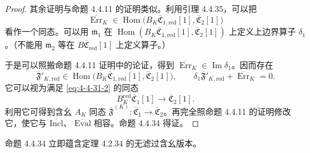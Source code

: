 \begin{proof}
其余证明与命题 4.4.11 的证明类似。利用引理 4.4.35，可以把
\[
 \overline{\operatorname{Err}}_K
 \in\operatorname{Hom}\bigl(
 B_K\overline{\mathfrak C}_{1,\mathrm{red}}[1],
 \overline{\mathfrak C}_2[1]
 \bigr)
\]
看作一个同态。可以用 $\overline{\mathfrak m}_1$ 在
$\operatorname{Hom}(B_K\overline{\mathfrak C}_{1,\mathrm{red}}[1],
\overline{\mathfrak C}_2[1])$ 上定义上边界算子 $\delta_1$。（不能用
$\overline{\mathfrak m}_2$ 等在
$B\overline{\mathfrak C}_{\mathrm{red}}[1]$ 上定义算子。）

于是可以照搬命题 4.4.11 证明中的论证，得到
$\overline{\operatorname{Err}}_K\in\operatorname{Im}\delta_1$。因而存在
\[
 \overline{\mathfrak F}'_{K,\mathrm{red}}
 \in\operatorname{Hom}\bigl(
 B_K\overline{\mathfrak C}_{1,\mathrm{red}}[1],
 \overline{\mathfrak C}_2[1]
 \bigr),
 \qquad
 \delta_1\overline{\mathfrak F}'_{K,\mathrm{red}}
 +\overline{\operatorname{Err}}_K=0.
\]
它可以视为满足 \eqref{eq:4-4-31-2} 的同态
\[
 B_K^{\mathrm{red}}\overline{\mathfrak C}_1[1]
 \longrightarrow\overline{\mathfrak C}_2[1].
\]
利用它可得到含幺 $A_K$ 同态
$\overline{\mathfrak F}^{(K)}\colon
\overline{\mathfrak C}_1\to\overline{\mathfrak C}_2$。再完全照命题
4.4.11 的证明修改它，使它与 $\overline{\mathrm{Incl}}$、
$\overline{\mathrm{Eval}}$ 相容。命题 4.4.34 得证。
\end{proof}

命题 4.4.34 立即蕴含定理 4.2.34 的无滤过含幺版本。
